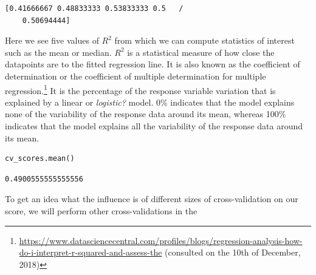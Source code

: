 \documentclass[11pt]{article}
\begin{document}
\begin{verbatim}
[0.41666667 0.48833333 0.53833333 0.5   /
    0.50694444]

\end{verbatim}

Here we see five values of \(R^{2}\) from which we can compute statistics of interest such as the mean or median. \(R^{2}\) is a statistical measure of how close the datapoints are to the fitted regression line. It is also known as the coefficient of determination or the coefficient of multiple determination for multiple regression.\footnote{\url{https://www.datasciencecentral.com/profiles/blogs/regression-analysis-how-do-i-interpret-r-squared-and-assess-the} (consulted on the 10th of December, 2018)} It is the percentage of the response variable variation that is explained by a linear or \emph{logistic?} model. 0\% indicates that the model explains none of the variability of the response data around its mean, whereas 100\% indicates that the model explains all the variability of the response data around its mean. 


\begin{verbatim}
cv_scores.mean()
\end{verbatim}

\begin{verbatim}
0.4900555555555556
\end{verbatim}

To get an idea what the influence is of different sizes of cross-validation on our score, we will perform other cross-validations in the
\end{document}
